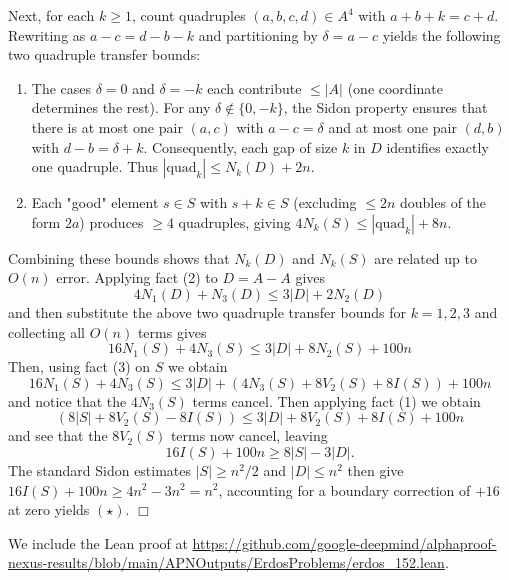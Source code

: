 Next, for each $k \geq 1$, count quadruples $(a,b,c,d) \in A^4$ with $a + b + k = c + d$. Rewriting as $a - c = d - b - k$ and partitioning by $\delta = a - c$ yields the following two quadruple transfer bounds:
\begin{enumerate}%
    \item The cases $\delta = 0$ and $\delta = -k$ each contribute $\leq |A|$ (one coordinate determines the rest). For any $\delta \notin \{0, -k\}$, the Sidon property ensures that there is at most one pair $(a, c)$ with $a - c = \delta$ and at most one pair $(d, b)$ with $d - b = \delta + k$. Consequently, each gap of size $k$ in $D$ identifies exactly one quadruple. Thus $|\text{quad}_k| \leq N_k(D) + 2n$.
    \item Each "good" element $s \in S$ with $s + k \in S$ (excluding $\leq 2n$ doubles of the form $2a$) produces $\geq 4$ quadruples, giving $4N_k(S) \leq |\text{quad}_k| + 8n$.
\end{enumerate}

Combining these bounds shows that $N_k(D)$ and $N_k(S)$ are related up to $O(n)$ error. Applying fact (2) to $D = A - A$ gives
$$4N_1(D) + N_3(D) \leq 3|D| + 2N_2(D)$$
and then substitute the above two quadruple transfer bounds for $k = 1, 2, 3$ and collecting all $O(n)$ terms gives
$$16N_1(S) + 4N_3(S) \leq 3|D| + 8N_2(S) + 100n$$
Then, using fact (3) on $S$ we obtain
$$16N_1(S) + 4N_3(S) \leq 3 |D| + (4N_3(S) + 8V_2(S) + 8I(S)) + 100n$$
and notice that the $4N_3(S)$ terms cancel. Then applying fact (1) we obtain
$$(8|S| + 8V_2(S) - 8I(S)) \leq 3 |D| + 8 V_2(S) + 8I(S) + 100n$$
and see that the $8V_2(S)$ terms now cancel, leaving
$$16I(S) + 100n \geq 8|S| - 3|D|.$$
The standard Sidon estimates $|S| \geq n^2/2$ and $|D| \leq n^2$ then give $16I(S) + 100n \geq 4n^2 - 3n^2 = n^2$, accounting for a boundary correction of $+16$ at zero yields $(\star)$. \hfill $\Box$

We include the Lean proof at \url{https://github.com/google-deepmind/alphaproof-nexus-results/blob/main/APNOutputs/ErdosProblems/erdos_152.lean}.